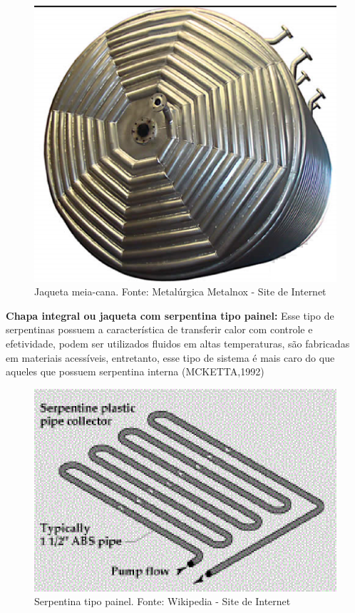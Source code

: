 \begin{figure}[h]
	\centering
	\includegraphics[keepaspectratio=true,scale=0.2]{figuras/jaqueta4.eps}
	\caption{Jaqueta meia-cana. Fonte: Metalúrgica Metalnox - Site de Internet}
	\label{jaqueta4}
\end{figure}

\textbf{Chapa integral ou jaqueta com serpentina tipo painel:} Esse tipo de serpentinas possuem a característica de transferir calor com controle e efetividade, podem ser utilizados fluidos em altas temperaturas, são fabricadas em materiais acessíveis, entretanto, esse tipo de sistema é mais caro do que aqueles que possuem serpentina interna (MCKETTA,1992)

\begin{figure}[h]
	\centering
	\includegraphics[keepaspectratio=true,scale=0.8]{figuras/serpentina.eps}
	\caption{Serpentina tipo painel. Fonte: Wikipedia - Site de Internet}
	\label{serpentina}
\end{figure}

